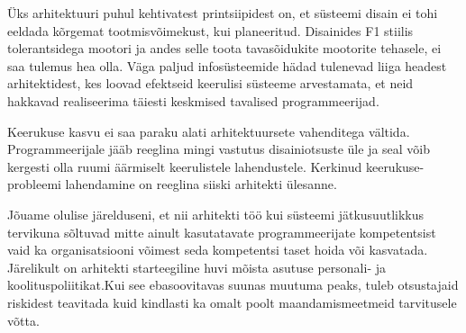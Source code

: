 \documentclass{tufte-book}
\begin{document}
Üks arhitektuuri puhul kehtivatest printsiipidest on, et süsteemi disain ei tohi eeldada kõrgemat tootmisvõimekust, kui planeeritud. Disainides F1 stiilis tolerantsidega mootori ja andes selle toota tavasõidukite mootorite tehasele, ei saa tulemus hea olla. Väga paljud infosüsteemide hädad tulenevad liiga headest arhitektidest, kes loovad efektseid keerulisi süsteeme arvestamata, et neid hakkavad realiseerima täiesti keskmised tavalised programmeerijad. 

Keerukuse kasvu ei saa paraku alati arhitektuursete vahenditega vältida. Programmeerijale jääb reeglina mingi vastutus disainiotsuste üle ja seal võib kergesti olla ruumi äärmiselt keerulistele lahendustele. Kerkinud keerukuse-probleemi lahendamine on reeglina siiski arhitekti ülesanne. 

Jõuame olulise järelduseni, et nii arhitekti töö kui süsteemi jätkusuutlikkus tervikuna sõltuvad mitte ainult kasutatavate programmeerijate kompetentsist vaid ka organisatsiooni võimest seda kompetentsi taset hoida või kasvatada. Järelikult on arhitekti starteegiline huvi mõista asutuse personali- ja koolituspoliitikat.Kui see ebasoovitavas suunas muutuma peaks, tuleb otsustajaid riskidest teavitada kuid kindlasti ka omalt poolt maandamismeetmeid tarvitusele võtta.
\end{document}
